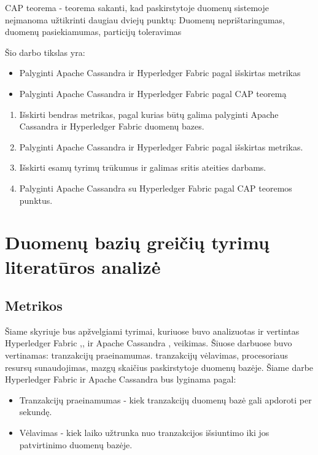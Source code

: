 \documentclass{VUMIFPSkursinis}
\begin{document}

	CAP teorema - teorema sakanti, kad paskirstytoje duomenų sistemoje neįmanoma užtikrinti daugiau dviejų punktų: Duomenų neprištaringumas, duomenų pasiekiamumas, particijų toleravimas \newline
	
	Šio darbo tikslas yra:
	\begin{itemize}
		\item{Palyginti Apache Cassandra ir Hyperledger Fabric pagal išskirtas metrikas}
		\item{Palyginti Apache Cassandra ir Hyperledger Fabric pagal CAP teoremą}
		
	\end{itemize}

	\begin{enumerate}
		\item{Išskirti bendras metrikas, pagal kurias būtų galima palyginti Apache Cassandra ir Hyperledger Fabric duomenų bazes.}
		\item{Palyginti Apache Cassandra ir Hyperledger Fabric pagal išskirtas metrikas.}
		\item{Išskirti esamų tyrimų trūkumus ir galimas sritis ateities darbams.}
		\item{Palyginti Apache Cassandra su Hyperledger Fabric pagal CAP teoremos punktus.}
		
	\end{enumerate}
\pagebreak
\section{Duomenų bazių greičių tyrimų literatūros analizė}

	\subsection{Metrikos}
		Šiame skyriuje bus apžvelgiami tyrimai, kuriuose buvo analizuotas ir vertintas Hyperledger Fabric \cite{IMBResearch},\cite{ThailandPerf},\cite{ShaFabPerf} ir Apache Cassandra \cite{BITCass},\cite{MonCas} veikimas. 
		Šiuose darbuose buvo vertinamas: tranzakcijų praeinamumas. tranzakcijų vėlavimas, procesoriaus resursų sunaudojimas, mazgų skaičius paskirstytoje duomenų bazėje. \newline
		Šiame darbe Hyperledger Fabric ir Apache Cassandra bus lyginama pagal:
		\begin{itemize}
			\item{Tranzakcijų praeinamumas - kiek tranzakcijų duomenų bazė gali apdoroti per sekundę.}
			\item{Vėlavimas - kiek laiko užtrunka nuo tranzakcijos išsiuntimo iki jos patvirtinimo duomenų bazėje.}
		\end{itemize}
\end{document}
